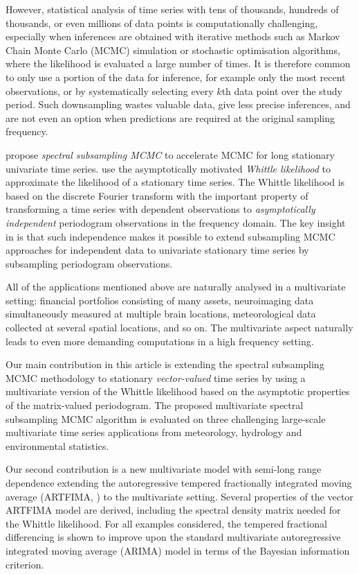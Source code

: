 \documentclass[11pt,english,oneside]{amsart}
\numberwithin{equation}{section}
\theoremstyle{plain}
\numberwithin{equation}{section}
\begin{document}
However, statistical analysis of time series with tens of thousands, hundreds of thousands, or even millions of data points is computationally challenging, especially when inferences are obtained with iterative methods such as Markov Chain Monte Carlo (MCMC) simulation or stochastic optimisation algorithms, where the likelihood is evaluated a large number of times. It is therefore common to only use a portion of the data for inference, for example only the most recent observations, or by systematically selecting every $k$th data point over the study period. Such downsampling wastes valuable data, give less precise inferences, and are not even an option when predictions are required at the original sampling frequency.

\citet{salomone2019spectral} propose \emph{spectral subsampling MCMC} to accelerate MCMC for long stationary univariate time series. \citet{salomone2019spectral} use the asymptotically motivated \textit{Whittle likelihood} \citep{whittle1953analysis} to approximate the likelihood of a stationary time series. The Whittle likelihood is based on the discrete Fourier transform with the important property of transforming a time series with dependent observations to \emph{asymptotically independent} periodogram observations in the frequency domain. The key insight in \citet{salomone2019spectral} is that such independence makes it possible to extend subsampling MCMC approaches for independent data \citep{quiroz2019speeding, quiroz2020block, dang2019hamiltonian} to univariate stationary time series by subsampling periodogram observations. 

All of the applications mentioned above are naturally analysed in a multivariate setting: financial portfolios consisting of many assets, neuroimaging data simultaneously measured at multiple brain locations, meteorological data collected at several spatial locations, and so on. The multivariate aspect naturally leads to even more demanding computations in a high frequency setting. 

Our main contribution in this article is extending the spectral subsampling MCMC methodology to stationary \emph{vector-valued} time series by using a multivariate version of the Whittle likelihood based on the asymptotic properties of the matrix-valued periodogram. The proposed multivariate spectral subsampling MCMC algorithm is evaluated on three challenging large-scale multivariate time series applications from meteorology, hydrology and environmental statistics. 

Our second contribution is a new multivariate model with semi-long range dependence extending the autoregressive tempered fractionally integrated moving average (ARTFIMA, \citet{Sabzikar2019}) to the multivariate setting. Several properties of the vector ARTFIMA model are derived, including the spectral density matrix needed for the Whittle likelihood. For all examples considered, the tempered fractional differencing is shown to improve upon the standard multivariate autoregressive integrated moving average (ARIMA) model in terms of the Bayesian information criterion. 
\end{document}
